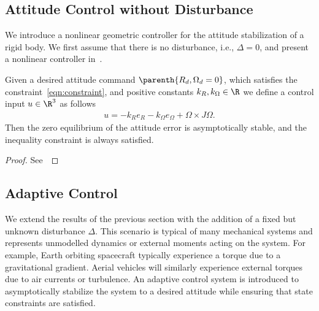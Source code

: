 \subsection{Attitude Control without Disturbance}
We introduce a nonlinear geometric controller for the attitude stabilization of a rigid body.
We first assume that there is no disturbance, i.e., \( \Delta = 0 \), and present a nonlinear controller in~.
\begin{prop}\label{prop:att_control}
	Given a desired attitude command \( \parenth{R_d, \Omega_d = 0} \), which satisfies the constraint~\cref{eqn:constraint}, and positive constants \( k_R, k_\Omega \in \R \) we define a control input \( u \in \R^3 \) as follows
	\begin{gather}
		u = -k_R e_R - k_\Omega e_\Omega + \Omega \times J \Omega . \label{eqn:nodist_control}
	\end{gather}
	Then the zero equilibrium of the attitude error is asymptotically stable, and the inequality constraint is always satisfied.
\end{prop}
\begin{proof}
See~
\end{proof}

\subsection{Adaptive Control}
We extend the results of the previous section with the addition of a fixed but unknown disturbance \( \Delta \).
This scenario is typical of many mechanical systems and represents unmodelled dynamics or external moments acting on the system.
For example, Earth orbiting spacecraft typically experience a torque due to a gravitational gradient.
Aerial vehicles will similarly experience external torques due to air currents or turbulence.
An adaptive control system is introduced to asymptotically stabilize the system to a desired attitude while ensuring that state constraints are satisfied. %

